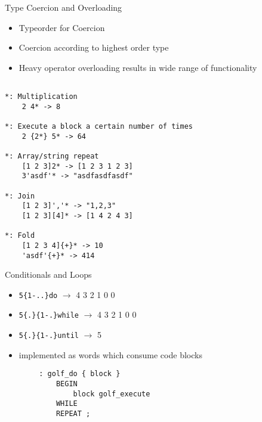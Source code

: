 \documentclass{beamer}
\begin{document}
\begin{frame}
    Type Coercion and Overloading

    \begin{itemize}
        \item Typeorder for Coercion
        \item Coercion according to highest order type
        \item Heavy operator overloading results in wide range of functionality

    \end{itemize}
\end{frame}


\begin{frame}[fragile]

\small \begin{lstlisting}

*: Multiplication
    2 4* -> 8

*: Execute a block a certain number of times
    2 {2*} 5* -> 64

*: Array/string repeat
    [1 2 3]2* -> [1 2 3 1 2 3]
    3'asdf'* -> "asdfasdfasdf"

*: Join
    [1 2 3]','* -> "1,2,3"
    [1 2 3][4]* -> [1 4 2 4 3]

*: Fold
    [1 2 3 4]{+}* -> 10
    'asdf'{+}* -> 414

\end{lstlisting}

\end{frame}

\begin{frame}[fragile]
    \vspace{0.5cm}
    Conditionals and Loops

    \begin{itemize}
        \item \texttt{5\{1-..\}do} $\rightarrow$ 4 3 2 1 0 0
        \item \texttt{5\{.\}\{1-.\}while}  $\rightarrow$  4 3 2 1 0 0
        \item \texttt{5\{.\}\{1-.\}until}  $\rightarrow$  5
        \item implemented as words which consume code blocks
    \end{itemize}
    \begin{verbatim}
        : golf_do { block }
            BEGIN
                block golf_execute
            WHILE
            REPEAT ;
    \end{verbatim}
\end{frame}
\end{document}
